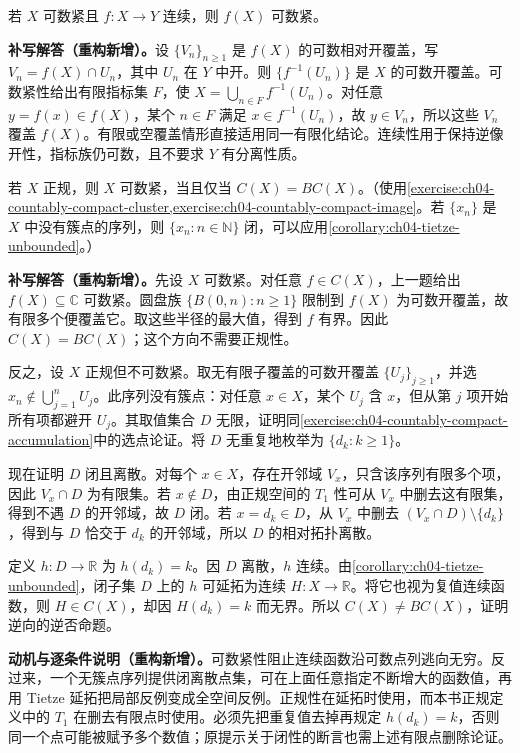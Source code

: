 \documentclass[../../main.tex]{subfiles}%
\begin{document}
\begin{exercise}\label{exercise:ch04-countably-compact-image}
若 $X$ 可数紧且 $f:X\to Y$ 连续，则 $f(X)$ 可数紧。
\end{exercise}
\begin{solution}
\textbf{补写解答（重构新增）。}设 $\{V_n\}_{n\ge1}$ 是 $f(X)$ 的可数相对开覆盖，写 $V_n=f(X)\cap U_n$，其中 $U_n$ 在 $Y$ 中开。则 $\{f^{-1}(U_n)\}$ 是 $X$ 的可数开覆盖。可数紧性给出有限指标集 $F$，使 $X=\bigcup_{n\in F}f^{-1}(U_n)$。对任意 $y=f(x)\in f(X)$，某个 $n\in F$ 满足 $x\in f^{-1}(U_n)$，故 $y\in V_n$，所以这些 $V_n$ 覆盖 $f(X)$。有限或空覆盖情形直接适用同一有限化结论。连续性用于保持逆像开性，指标族仍可数，且不要求 $Y$ 有分离性质。
\end{solution}
\begin{exercise}\label{exercise:ch04-normal-countably-compact-bounded}
若 $X$ 正规，则 $X$ 可数紧，当且仅当 $C(X)=BC(X)$。（使用\cref{exercise:ch04-countably-compact-cluster,exercise:ch04-countably-compact-image}。若 $\{x_n\}$ 是 $X$ 中没有簇点的序列，则 $\{x_n:n\in\mathbb N\}$ 闭，可以应用\cref{corollary:ch04-tietze-unbounded}。）
\end{exercise}
\begin{solution}
\textbf{补写解答（重构新增）。}先设 $X$ 可数紧。对任意 $f\in C(X)$，上一题给出 $f(X)\subseteq\mathbb C$ 可数紧。圆盘族 $\{B(0,n):n\ge1\}$ 限制到 $f(X)$ 为可数开覆盖，故有限多个便覆盖它。取这些半径的最大值，得到 $f$ 有界。因此 $C(X)=BC(X)$；这个方向不需要正规性。

反之，设 $X$ 正规但不可数紧。取无有限子覆盖的可数开覆盖 $\{U_j\}_{j\ge1}$，并选 $x_n\notin\bigcup_{j=1}^nU_j$。此序列没有簇点：对任意 $x\in X$，某个 $U_j$ 含 $x$，但从第 $j$ 项开始所有项都避开 $U_j$。其取值集合 $D$ 无限，证明同\cref{exercise:ch04-countably-compact-accumulation}中的选点论证。将 $D$ 无重复地枚举为 $\{d_k:k\ge1\}$。

现在证明 $D$ 闭且离散。对每个 $x\in X$，存在开邻域 $V_x$，只含该序列有限多个项，因此 $V_x\cap D$ 为有限集。若 $x\notin D$，由正规空间的 $T_1$ 性可从 $V_x$ 中删去这有限集，得到不遇 $D$ 的开邻域，故 $D$ 闭。若 $x=d_k\in D$，从 $V_x$ 中删去 $(V_x\cap D)\setminus\{d_k\}$，得到与 $D$ 恰交于 $d_k$ 的开邻域，所以 $D$ 的相对拓扑离散。

定义 $h:D\to\mathbb R$ 为 $h(d_k)=k$。因 $D$ 离散，$h$ 连续。由\cref{corollary:ch04-tietze-unbounded}，闭子集 $D$ 上的 $h$ 可延拓为连续 $H:X\to\mathbb R$。将它也视为复值连续函数，则 $H\in C(X)$，却因 $H(d_k)=k$ 而无界。所以 $C(X)\ne BC(X)$，证明逆向的逆否命题。
\end{solution}
\begin{remark}
\textbf{动机与逐条件说明（重构新增）。}可数紧性阻止连续函数沿可数点列逃向无穷。反过来，一个无簇点序列提供闭离散点集，可在上面任意指定不断增大的函数值，再用 Tietze 延拓把局部反例变成全空间反例。正规性在延拓时使用，而本书正规定义中的 $T_1$ 在删去有限点时使用。必须先把重复值去掉再规定 $h(d_k)=k$，否则同一个点可能被赋予多个数值；原提示关于闭性的断言也需上述有限点删除论证。
\end{remark}
\end{document}
